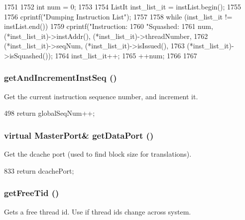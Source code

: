\begin{DoxyCode}
1751 {
1752     int num = 0;
1753 
1754     ListIt inst_list_it = instList.begin();
1755 
1756     cprintf("Dumping Instruction List\n");
1757 
1758     while (inst_list_it != instList.end()) {
1759         cprintf("Instruction:%
1760                 "Squashed:%
1761                 num, (*inst_list_it)->instAddr(), (*inst_list_it)->threadNumber,
1762                 (*inst_list_it)->seqNum, (*inst_list_it)->isIssued(),
1763                 (*inst_list_it)->isSquashed());
1764         inst_list_it++;
1765         ++num;
1766     }
1767 }
\end{DoxyCode}
\hypertarget{classFullO3CPU_ace86a0dff0fe9648b7221e3a98fb4533}{
\subsubsection[{getAndIncrementInstSeq}]{ getAndIncrementInstSeq ()}}
\label{classFullO3CPU_ace86a0dff0fe9648b7221e3a98fb4533}
Get the current instruction sequence number, and increment it. 


\begin{DoxyCode}
498     { return globalSeqNum++; }
\end{DoxyCode}
\hypertarget{classFullO3CPU_aeea6b55ae1c4be53c21dbee434b221d4}{
\subsubsection[{getDataPort}]{\setlength{\rightskip}{0pt plus 5cm}virtual {\bf MasterPort}\& getDataPort ()}}
\label{classFullO3CPU_aeea6b55ae1c4be53c21dbee434b221d4}
Get the dcache port (used to find block size for translations). 


\begin{DoxyCode}
833 { return dcachePort; }
\end{DoxyCode}
\hypertarget{classFullO3CPU_a64117a0245250fc5be941e729bedcc03}{
\subsubsection[{getFreeTid}]{ getFreeTid ()}}
\label{classFullO3CPU_a64117a0245250fc5be941e729bedcc03}
Gets a free thread id. Use if thread ids change across system. 



